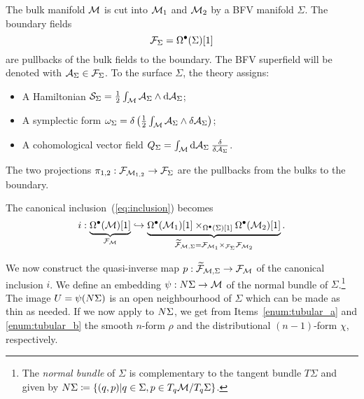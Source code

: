 The bulk manifold $\mathcal{M}$ is cut into $\mathcal{M}_1$ and $\mathcal{M}_2$ by a BFV manifold $\Sigma$.
The boundary fields
\begin{equation*}
    \mathcal{F}_\Sigma = \Omega^\bullet (\Sigma)[1]
\end{equation*}
are pullbacks of the bulk fields to the boundary. The BFV superfield will be denoted with $\mathcal{A}_\Sigma \in \mathcal{F}_\Sigma$.
To the surface $\Sigma$, the theory assigns:
\begin{itemize} %
    \item A Hamiltonian $\mathcal{S}_\Sigma = \frac{1}{2}\int_{\mathcal{M}} \mathcal{A}_\Sigma \wedge \dd \mathcal{A}_\Sigma$;
    \item A symplectic form $\omega_\Sigma = \delta \left( \frac{1}{2} \int_{\mathcal{M}} \mathcal{A}_\Sigma \wedge \delta \mathcal{A}_\Sigma \right)$;
    \item A cohomological vector field $Q_\Sigma = \int_{\mathcal{M}} \dd \mathcal{A}_\Sigma \: \frac{\delta}{\delta \mathcal{A}_\Sigma}$.
\end{itemize}

The two projections $\pi_{1,2} : \mathcal{F}_{\mathcal{M}_{1,2}} \rightarrow \mathcal{F}_\Sigma$ are the pullbacks from the bulks to the boundary.

The canonical inclusion~(\ref{eq:inclusion}) becomes
\begin{equation*}
    i : \underbrace{\Omega^\bullet (\mathcal{M})[1]}_{\mathcal{F}_{\mathcal{M}}} \hookrightarrow 
    \underbrace{\Omega^\bullet (\mathcal{M}_1)[1] \times_{\Omega^\bullet (\Sigma)[1]} \Omega^\bullet (\mathcal{M}_2)[1]}_{\widetilde{\mathcal{F}}_{\mathcal{M}, \Sigma} = \mathcal{F}_{\mathcal{M}_1} \times_{\mathcal{F}_\Sigma} \mathcal{F}_{\mathcal{M}_2}} .
\end{equation*}

We now construct the quasi-inverse map $p: \widetilde{\mathcal{F}}_{\mathcal{M}, \Sigma} \rightarrow \mathcal{F}_{\mathcal{M}}$ of the canonical inclusion $i$.
We define an embedding $\psi: N \Sigma \rightarrow \mathcal{M}$ of the normal bundle of $\Sigma$.\footnote{The \emph{normal bundle} of $\Sigma$ is complementary to the tangent bundle $T\Sigma$ and given by 
$N\Sigma \coloneqq \{ (q, p) | q \in \Sigma, p \in T_q \mathcal{M} / T_q \Sigma \}$.}
The image $U = \psi(N \Sigma)$ is an open neighbourhood of $\Sigma$ which can be made as thin as needed.
If we now apply  to $N \Sigma$, we get from Items~\ref{enum:tubular_a} and \ref{enum:tubular_b} the smooth $n$-form $\rho$ and the distributional $(n-1)$-form $\chi$, respectively.

